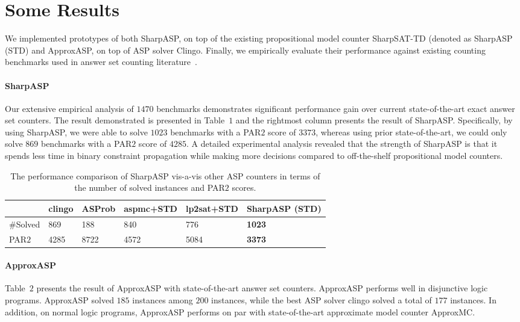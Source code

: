 \section{Some Results}
We implemented prototypes of both SharpASP, on top of the existing propositional model counter SharpSAT-TD (denoted as SharpASP (STD) and ApproxASP, on top of ASP solver Clingo. Finally, we empirically evaluate their performance against existing counting benchmarks used in answer set counting literature~\cite{FHMW2017,EHK2024,ACMS2015}.

\paragraph{SharpASP}
Our extensive empirical analysis of $1470$ benchmarks demonstrates significant performance gain over current state-of-the-art exact answer set counters. The result demonstrated is presented in Table~$1$ and the rightmost column presents the result of SharpASP. Specifically, by using SharpASP, we were able to solve $1023$ benchmarks with a PAR$2$ score of $3373$, whereas using prior state-of-the-art, we could only solve $869$ benchmarks with a PAR$2$ score of $4285$. A detailed experimental analysis revealed that the strength of SharpASP is that it spends less time in binary constraint propagation while making more decisions compared to off-the-shelf propositional model counters.

\begin{table}[t]
      \centering
      \begin{tabular}{m{4em} m{4em} m{4em} m{4em} m{4em} m{4em}}
      \toprule
      & clingo & ASProb & aspmc+STD & lp2sat+STD & SharpASP (STD)\\
     \midrule 
      \#Solved  & 869 & 188 & 840 & 776 & \textbf{1023}\\
      \midrule
      PAR$2$ & 4285 & 8722 & 4572 & 5084 & \textbf{3373}\\
      \bottomrule
      \end{tabular}
      \caption{The performance comparison of SharpASP vis-a-vis other ASP counters in terms of the number of solved instances and PAR$2$ scores.
      }
\end{table}

\paragraph{ApproxASP}
Table~$2$ presents the result of ApproxASP with state-of-the-art answer set counters.
ApproxASP performs well in disjunctive logic programs.
ApproxASP solved $185$ instances among $200$ instances, while the
best ASP solver clingo solved a total of $177$ instances.  In
addition, on normal logic programs, ApproxASP performs on par with
state-of-the-art approximate model counter ApproxMC.

